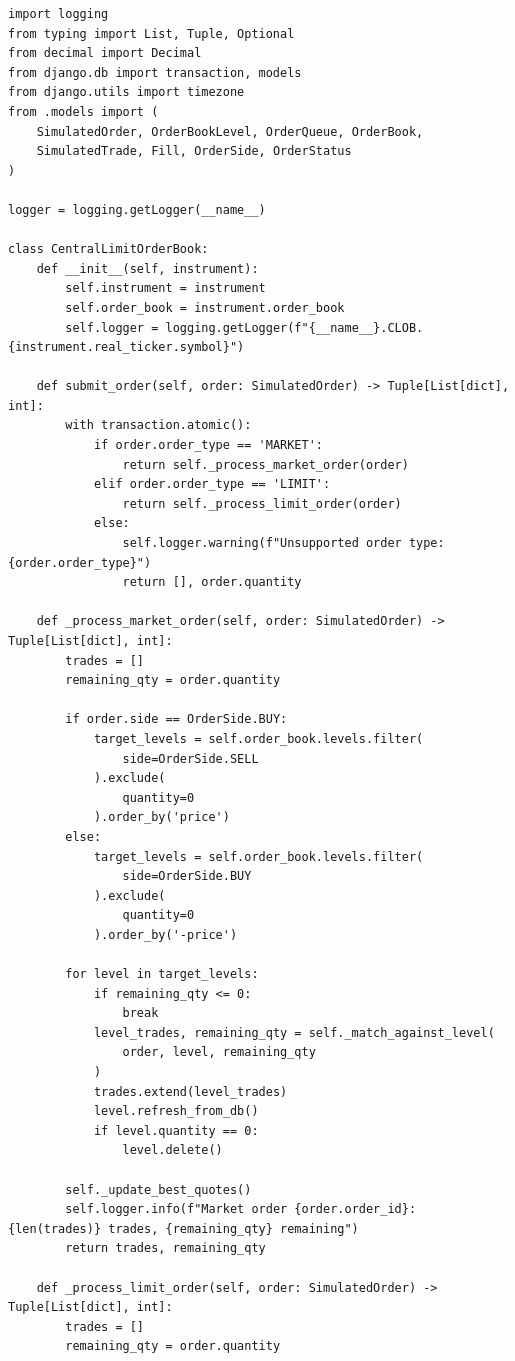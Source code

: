 \documentclass[12pt]{article}
\begin{document}
\begin{verbatim}
import logging
from typing import List, Tuple, Optional
from decimal import Decimal
from django.db import transaction, models
from django.utils import timezone
from .models import (
    SimulatedOrder, OrderBookLevel, OrderQueue, OrderBook,
    SimulatedTrade, Fill, OrderSide, OrderStatus
)

logger = logging.getLogger(__name__)

class CentralLimitOrderBook:
    def __init__(self, instrument):
        self.instrument = instrument
        self.order_book = instrument.order_book
        self.logger = logging.getLogger(f"{__name__}.CLOB.{instrument.real_ticker.symbol}")

    def submit_order(self, order: SimulatedOrder) -> Tuple[List[dict], int]:
        with transaction.atomic():
            if order.order_type == 'MARKET':
                return self._process_market_order(order)
            elif order.order_type == 'LIMIT':
                return self._process_limit_order(order)
            else:
                self.logger.warning(f"Unsupported order type: {order.order_type}")
                return [], order.quantity
    
    def _process_market_order(self, order: SimulatedOrder) -> Tuple[List[dict], int]:
        trades = []
        remaining_qty = order.quantity

        if order.side == OrderSide.BUY:
            target_levels = self.order_book.levels.filter(
                side=OrderSide.SELL
            ).exclude(
                quantity=0
            ).order_by('price')
        else:
            target_levels = self.order_book.levels.filter(
                side=OrderSide.BUY
            ).exclude(
                quantity=0
            ).order_by('-price')

        for level in target_levels:
            if remaining_qty <= 0:
                break
            level_trades, remaining_qty = self._match_against_level(
                order, level, remaining_qty
            )
            trades.extend(level_trades)
            level.refresh_from_db()
            if level.quantity == 0:
                level.delete()

        self._update_best_quotes()
        self.logger.info(f"Market order {order.order_id}: {len(trades)} trades, {remaining_qty} remaining")
        return trades, remaining_qty

    def _process_limit_order(self, order: SimulatedOrder) -> Tuple[List[dict], int]:
        trades = []
        remaining_qty = order.quantity


\end{verbatim}
\end{document}

